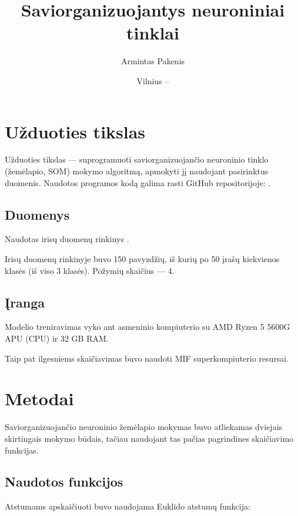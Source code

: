 \documentclass{VUMIFPSbakalaurinis}
\institute{Informatikos institutas}  %
\title{Saviorganizuojantys neuroniniai tinklai}
\author{Armintas Pakenis}
\date{Vilnius – \the\year}
\begin{document}
\maketitle


\tableofcontents

\section{Užduoties tikslas}
Užduoties tikslas — suprogramuoti saviorganizuojančio neuroninio tinklo (žemėlapio, SOM)
mokymo algoritmą, apmokyti jį naudojant pasirinktus duomenis.
Naudotos programos kodą 
galima rasti GitHub repositorijoje: 
\href{https://github.com/ArmintasP/Computational-intelligence/tree/main/Lab5}{\color{cyan}{https://github.com/ArmintasP/Computational-intelligence/tree/main/Lab5}}.

\subsection{Duomenys}
Naudotas irisų duomenų rinkinys
\href{https://archive.ics.uci.edu/ml/datasets/iris}{\color{cyan}{https://archive.ics.uci.edu/ml/datasets/iris}}.

Irisų duomenų rinkinyje buvo 150 pavyzdžių,
iš kurių po 50 įrašų kiekvienos klasės (iš viso 3 klasės).
Požymių skaičius — 4.

\subsection{Įranga}
Modelio treniravimas vyko ant asmeninio kompiuterio su
AMD Ryzen 5 5600G APU (CPU) ir 32 GB RAM.

Taip pat ilgesniems skaičiavimas buvo naudoti
MIF superkompiuterio resursai.

\section{Metodai}

Saviorganizuojančio neuroninio žemėlapio
mokymas buvo atliekamas dviejais skirtingais mokymo būdais, 
tačiau naudojant tas pačias pagrindines skaičiavimo funkcijas.

\subsection{Naudotos funkcijos}
Atstumams apskaičiuoti buvo naudojama Euklido atstumų funkcija:
\end{document}
